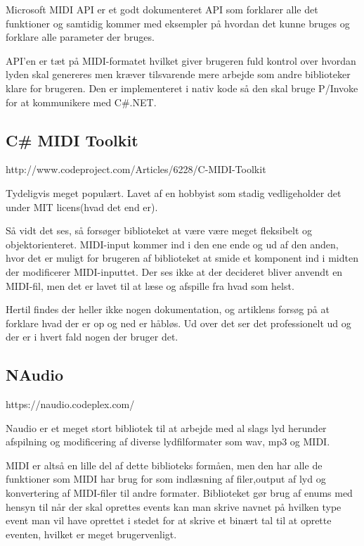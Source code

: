 Microsoft MIDI API er et godt dokumenteret API som forklarer alle det funktioner og samtidig kommer med eksempler på hvordan det kunne bruges og forklare alle parameter der bruges.

API’en er tæt på MIDI-formatet hvilket giver brugeren fuld kontrol over hvordan lyden skal genereres men kræver tilsvarende mere arbejde som andre biblioteker klare for brugeren. 
Den er implementeret i nativ kode så den skal bruge P/Invoke for at kommunikere med C\#.NET.



\subsection{C\# MIDI Toolkit}

http://www.codeproject.com/Articles/6228/C-MIDI-Toolkit

Tydeligvis meget populært. 
Lavet af en hobbyist som stadig vedligeholder det under MIT licens(hvad det end er).

Så vidt det ses, så forsøger biblioteket at være være meget fleksibelt og objektorienteret.  
MIDI-input kommer ind i den ene ende og ud af den anden, hvor det er muligt for brugeren af biblioteket at smide et komponent ind i midten der modificerer MIDI-inputtet. 
Der ses ikke at der decideret bliver anvendt en MIDI-fil, men det er lavet til at læse og afspille fra hvad som helst.

Hertil findes der heller ikke nogen dokumentation, og artiklens forsøg på at forklare hvad der er op og ned er håbløs. 
Ud over det ser det professionelt ud og der er i hvert fald nogen der bruger det.

\subsection{NAudio}

https://naudio.codeplex.com/

Naudio er et meget stort bibliotek til at arbejde med al slags lyd herunder afspilning og modificering af diverse lydfilformater som wav, mp3 og MIDI.

MIDI er altså en lille del af dette biblioteks formåen, men den har alle de funktioner som MIDI har brug for som indlæsning af filer,output af lyd og konvertering af MIDI-filer til andre formater. 
Biblioteket  gør brug af enums med hensyn til når der skal oprettes events kan man skrive navnet på hvilken type event man vil have oprettet i stedet for at skrive et binært tal til at oprette eventen, hvilket er meget brugervenligt.

